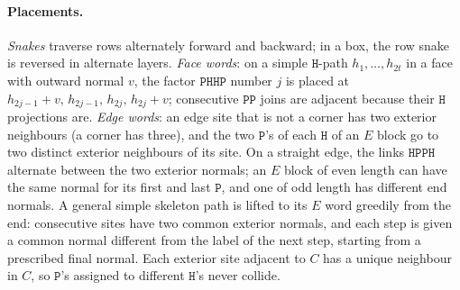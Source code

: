 \documentclass[11pt,letterpaper]{article}
\theoremstyle{definition}
\theoremstyle{remark}
\newcommand{\Hh}{\mathtt{H}}
\newcommand{\Pp}{\mathtt{P}}
\begin{document}
\paragraph{Placements.}
\emph{Snakes} traverse rows alternately forward and backward; in a box, the row snake is reversed in
alternate layers. \emph{Face words}: on a simple $\Hh$-path $h_1,\dots,h_{2t}$ in a face with outward
normal $v$, the factor $\Pp\Hh\Hh\Pp$ number $j$ is placed at $h_{2j-1}+v,\,h_{2j-1},\,h_{2j},\,h_{2j}+v$;
consecutive $\Pp\Pp$ joins are adjacent because their $\Hh$ projections are. \emph{Edge words}: an
edge site that is not a corner has two exterior neighbours (a corner has three), and the two $\Pp$'s of
each $\Hh$ of an $E$ block go to two distinct exterior neighbours of its site. On a straight edge, the
links $\Hh\Pp\Pp\Hh$ alternate between the two exterior normals; an $E$ block of even length can have
the same normal for its first and last $\Pp$, and one of odd length has different end normals. A
general simple skeleton path is lifted to its $E$ word greedily from the end: consecutive sites
have two common exterior normals, and each step is given a common normal different from the label
of the next step, starting from a prescribed final normal. Each exterior site adjacent to $C$ has a
unique neighbour in $C$, so $\Pp$'s assigned to different $\Hh$'s never collide.
\end{document}
